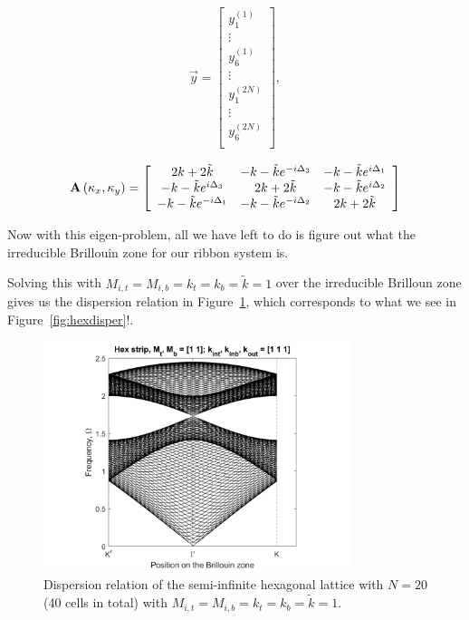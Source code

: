 \begin{align}
\vec{y}=\left[
\begin{array}{c}
y_1^{(1)}\\
\vdots\\
y_6^{(1)}\\
\vdots\\
y_1^{(2N)}\\
\vdots\\
y_6^{(2N)}\\
\end{array}\right],
\end{align}

\begin{align}
  \mathbf{A}\left(\kappa_{x},\kappa_{y}\right)=\left[
\begin{array}{ccc}
2k+2\tilde{k} & -k-\tilde{k}e^{-i\Delta_3} & -k-\tilde{k}e^{i\Delta_1} \\
-k-\tilde{k}e^{i\Delta_3} & 2k+2\tilde{k} & -k-\tilde{k}e^{i\Delta_2} \\
-k-\tilde{k}e^{-i\Delta_1} & -k-\tilde{k}e^{-i\Delta_2} & 2k+2\tilde{k} 
\end{array}\right]
\end{align}

Now with this eigen-problem, all we have left to do is figure out what the
irreducible Brillouin zone for our ribbon system is.

Solving this with $M_{i,t}=M_{i,b}=k_t=k_b=\tilde{k}=1$ over the irreducible
Brilloun zone gives us the dispersion relation in
Figure~\ref{fig:hexstripdisper}, which corresponds to what we see in
Figure~\ref{fig:hexdisper}!.

\begin{figure}[!h]
\centering
\includegraphics[width=0.8\textwidth]{imgs/hexstrip.png}
\caption{\label{fig:hexstripdisper} Dispersion relation of the semi-infinite
  hexagonal lattice with $N=20$ (40 cells in total) with
  $M_{i,t}=M_{i,b}=k_t=k_b=\tilde{k}=1$.}
\end{figure}

